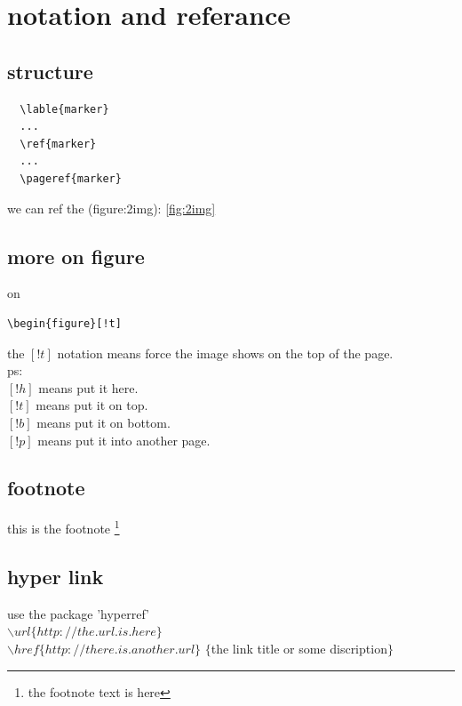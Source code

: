 \documentclass[11pt,a4paper]{article}
\begin{document}
\section{notation and referance}{
  \subsection{structure}{
    {
\begin{verbatim}
  \lable{marker}
  ...
  \ref{marker}
  ...
  \pageref{marker}
\end{verbatim}
    }
    we can ref the (figure:2img): \ref{fig:2img}
  }

  \subsection{more on figure}{
    on\begin{verbatim}\begin{figure}[!t]\end{verbatim}
    the $[!t]$ notation means force the image shows on the top of the page. \\
    ps: \\
    $[!h]$ means put it here. \\
    $[!t]$ means put it on top. \\
    $[!b]$ means put it on bottom. \\
    $[!p]$ means put it into another page. \\
  }

  \subsection{footnote}{
    this is the footnote \footnote{the footnote text is here}
  }
  \subsection{hyper link}{
    use the package 'hyperref' \\
    $\backslash url\{http://the.url.is.here\}$ \\
    $\backslash href\{http://there.is.another.url\}$
    $\{$the link title or some discription$\}$
  }
}
\end{document}
